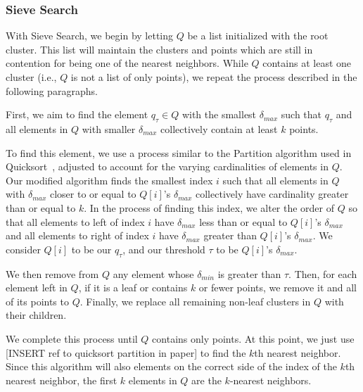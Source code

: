 \subsubsection{Sieve Search}
\label{subsubsec:methods:knn-search:sieve}
With Sieve Search, we begin by letting $Q$ be a list initialized with the root cluster. This list will maintain the 
clusters and points which are still in contention for being one of the nearest neighbors.
While $Q$ contains at least one cluster (i.e., $Q$ is not a list of only points), we repeat the process described in 
the following paragraphs. 

First, 
we aim to find the element $q_{\tau} \in Q$ with the smallest $\delta_{max}$ such that 
$q_{\tau}$ and all elements in $Q$ with smaller $\delta_{max}$ collectively contain at least $k$ points. 

To find this element, 
we use a process similar to the Partition algorithm used in Quicksort~\cite{10.1093/comjnl/5.1.10}, adjusted to account for the varying cardinalities of elements in $Q$. Our modified algorithm finds the smallest index $i$ such 
that all elements in $Q$ with $\delta_{max}$ closer to or equal to $Q[i]$'s $\delta_{max}$ collectively have cardinality greater
than or equal to $k$. In the process of finding this index, we alter the order of $Q$ so that all elements to left
of index $i$ have $\delta_{max}$ less than or equal to $Q[i]$'s $\delta_{max}$ and all elements to right of index $i$
have $\delta_{max}$ greater than $Q[i]$'s $\delta_{max}$. We consider $Q[i]$ to be our $q_{\tau}$, and our threshold 
$\tau$ to be $Q[i]$'s $\delta_{max}$.

We then remove from $Q$ any element whose $\delta_{min}$ is greater than $\tau$. Then, for each element left 
in $Q$, if it is a leaf or contains $k$ or fewer points, we remove it and all of its points to $Q$. Finally, we
replace all remaining non-leaf clusters in $Q$ with their children. 

We complete this process until $Q$ contains only points. At this point, we 
just use [INSERT ref to quicksort partition in paper] to find the $k$th 
nearest neighbor. Since this algorithm will also elements on the correct side of 
the index of the $k$th nearest neighbor, the first $k$ elements in $Q$ are the $k$-nearest neighbors.


